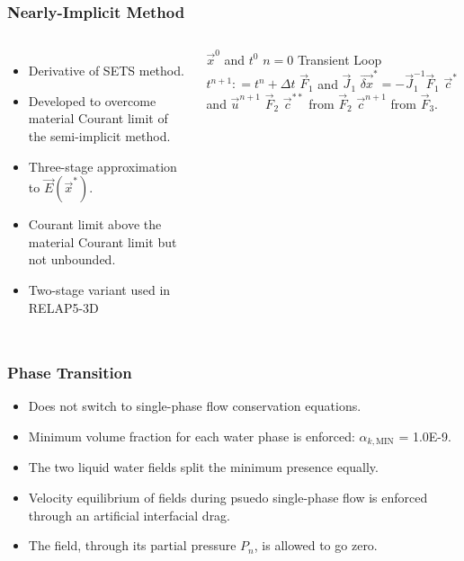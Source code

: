 \documentclass[compress,xcolor=table]{beamer}
\begin{document}
\begin{frame}
\frametitle{Nearly-Implicit Method}

\begin{columns}

\begin{itemize}
\item{Derivative of SETS method.}
\item{Developed to overcome material Courant limit of the semi-implicit method.}
\item{Three-stage approximation to $\vec{E}(\vec{x}^{*})$.}
\item{Courant limit above the material Courant limit but not unbounded.}
\item{Two-stage variant used in RELAP5-3D}
\end{itemize}

\begin{algorithmic}
\scriptsize
\Require $\vec{x}^{0}$ and $t^{0}$
\Set $n = 0$
\Loop \; Transient Loop
    \State $t^{n+1} : = t^{n} + \Delta t$
	\Calculate $\vec{F}_1$ and $\vec{J}_1$
	\Calculate $\vec{\delta x}^{*} = -\vec{J}^{-1}_1\vec{F}_1$
	\Calculate $\vec{c}^{*}$ and $\vec{u}^{n+1}$
	\Calculate $\vec{F}_2$
	\Calculate $\vec{c}^{**}$ from $\vec{F}_2$
	\Calculate $\vec{c}^{n+1}$ from $\vec{F}_3$.
\end{algorithmic}

\end{columns}

\end{frame}
\begin{frame}
\frametitle{Phase Transition}

\begin{itemize}
\item{Does not switch to single-phase flow conservation equations.}
\item{Minimum volume fraction for each water phase is enforced: $\alpha_{k,\text{MIN}}$ = 1.0E-9.}
\item{The two liquid water fields split the minimum presence equally.}
\item{Velocity equilibrium of fields during psuedo single-phase flow is enforced through an artificial interfacial drag.}
\item{The \ncg{} field, through its partial pressure $P_n$, is allowed to go zero.}
\end{itemize}

\end{frame}
\end{document}
